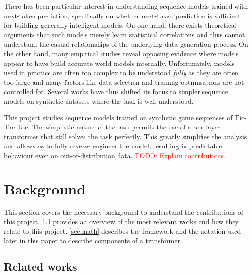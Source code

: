 \documentclass{article}
\newcommand{\todo}[1]{\textcolor{red}{TODO: #1}}
\newcommand{\ttt}{Tic-Tac-Toe\xspace}
\begin{document}
There has been particular interest in understanding sequence models trained with next-token prediction, specifically on whether next-token prediction is sufficient for building generally intelligent models. On one hand, there exists theoretical arguments \citep{bender2020climbing,merrill2021provable} that such models merely learn statistical correlations and thus cannot understand the casual relationships of the underlying data generation process. On the other hand, many empirical studies reveal opposing evidence where models appear to have build accurate world models internally. Unfortunately, models used in practice are often too complex to be understood \emph{fully} as they are often too large and many factors like data selection and training optimisations are not controlled for. Several works have thus shifted its focus to simpler sequence models on synthetic datasets \citep{toshniwal2021learning,orthello-gpt} where the task is well-understood.

This project studies sequence models trained on synthetic game sequences of \ttt. The simplistic nature of the task permits the use of a one-layer transformer that still solves the task perfectly. This greatly simplifies the analysis and allows us to fully reverse engineer the model, resulting in predictable behaviour even on out-of-distribution data. \todo{Explain contributions.}

\section{Background}

This section covers the necessary background to understand the contributions of this project. \cref{sec:related} provides an overview of the most relevant works and how they relate to this project. \cref{sec:math} describes the framework and the notation used later in this paper to describe components of a transformer.

\subsection{Related works} \label{sec:related}
\end{document}
